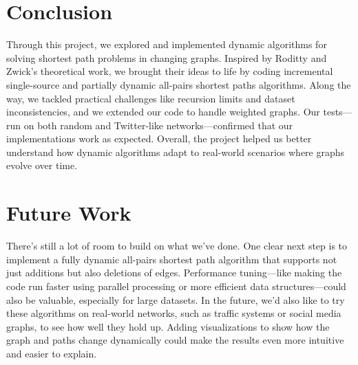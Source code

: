 \documentclass[11pt]{article}
\begin{document}
\section*{Conclusion}

Through this project, we explored and implemented dynamic algorithms for solving shortest path problems in changing graphs. Inspired by Roditty and Zwick’s theoretical work, we brought their ideas to life by coding incremental single-source and partially dynamic all-pairs shortest paths algorithms. Along the way, we tackled practical challenges like recursion limits and dataset inconsistencies, and we extended our code to handle weighted graphs. Our tests—run on both random and Twitter-like networks—confirmed that our implementations work as expected. Overall, the project helped us better understand how dynamic algorithms adapt to real-world scenarios where graphs evolve over time.

\section*{Future Work}

There’s still a lot of room to build on what we’ve done. One clear next step is to implement a fully dynamic all-pairs shortest path algorithm that supports not just additions but also deletions of edges. Performance tuning—like making the code run faster using parallel processing or more efficient data structures—could also be valuable, especially for large datasets. In the future, we’d also like to try these algorithms on real-world networks, such as traffic systems or social media graphs, to see how well they hold up. Adding visualizations to show how the graph and paths change dynamically could make the results even more intuitive and easier to explain.

\newpage
\nocite{*}


\end{document}
